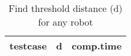 \documentclass{article}
\begin{document}
\begin{table}[h!]
  \begin{center}
    \caption{Find threshold distance (d) for any robot}
    \label{tab:table1}
    \begin{tabular}{l|c|r}
      \textbf{testcase} & \textbf{d} & \textbf{comp.time}\\
      \hline
    \end{tabular}
  \end{center}
\end{table}
\end{document}

